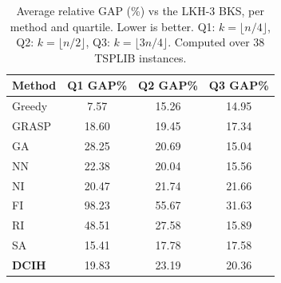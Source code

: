 \documentclass[conference]{IEEEtran}
\begin{document}
\begin{table}[htbp]
\centering
\caption{Average relative GAP (\%) vs the LKH-3 BKS, per method and quartile. Lower is better. Q1: $k=\lfloor n/4\rfloor$, Q2: $k=\lfloor n/2\rfloor$, Q3: $k=\lfloor 3n/4\rfloor$. Computed over 38 TSPLIB instances.}
\label{tab:resumen_gap}
\begin{tabular}{|l|c|c|c|}
\hline
\textbf{Method} & \textbf{Q1 GAP\%} & \textbf{Q2 GAP\%} & \textbf{Q3 GAP\%} \\
\hline
Greedy & 7.57 & 15.26 & 14.95 \\
GRASP & 18.60 & 19.45 & 17.34 \\
GA & 28.25 & 20.69 & 15.04 \\
NN & 22.38 & 20.04 & 15.56 \\
NI & 20.47 & 21.74 & 21.66 \\
FI & 98.23 & 55.67 & 31.63 \\
RI & 48.51 & 27.58 & 15.89 \\
SA & 15.41 & 17.78 & 17.58 \\
\textbf{DCIH} & 19.83 & 23.19 & 20.36 \\
\hline
\end{tabular}
\end{table}
\end{document}
